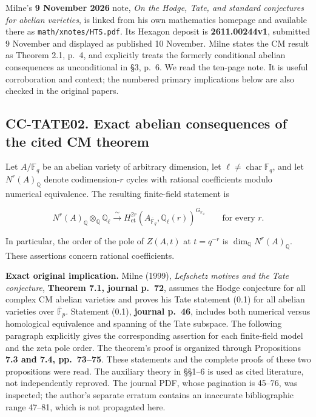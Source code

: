 \documentclass[11pt,a4paper]{article}
\theoremstyle{definition}\newtheorem{definition}[theorem]{Definition}
\theoremstyle{remark}\newtheorem{remark}[theorem]{Remark}
\begin{document}
Milne's \textbf{9 November 2026} note, \emph{On the Hodge, Tate, and
standard conjectures for abelian varieties}, is linked from his own
mathematics homepage and available there as
\texttt{math/xnotes/HTS.pdf}. Its Hexagon deposit is
\textbf{2611.00244v1}, submitted 9 November and displayed as published
10 November. Milne states the CM result as Theorem 2.1, p.~4, and
explicitly treats the formerly conditional abelian consequences as
unconditional in §3, p.~6. We read the ten-page note. It is useful
corroboration and context; the numbered primary implications below are
also checked in the original papers.

\subsection{CC-TATE02. Exact abelian consequences of the cited CM
theorem}\label{cc-tate02.-exact-abelian-consequences-of-the-cited-cm-theorem}

Let \(A/\mathbb F_q\) be an abelian variety of arbitrary dimension, let
\(\ell\ne\operatorname{char}\mathbb F_q\), and let
\(N^r(A)_{\mathbb Q}\) denote codimension-\(r\) cycles with rational
coefficients modulo numerical equivalence. The resulting finite-field
statement is

\[
N^r(A)_{\mathbb Q}\otimes_{\mathbb Q}\mathbb Q_\ell
\xrightarrow{\ \sim\ }
H^{2r}_{\mathrm{et}}(A_{\overline{\mathbb F}_q},\mathbb Q_\ell(r))^{G_{\mathbb F_q}}
\qquad\text{for every }r.
\]

In particular, the order of the pole of \(Z(A,t)\) at \(t=q^{-r}\) is
\(\dim_{\mathbb Q}N^r(A)_{\mathbb Q}\). These assertions concern
rational coefficients.

\textbf{Exact original implication.} Milne (1999), \emph{Lefschetz
motives and the Tate conjecture}, \textbf{Theorem 7.1, journal p.~72},
assumes the Hodge conjecture for all complex CM abelian varieties and
proves his Tate statement (0.1) for all abelian varieties over
\(\overline{\mathbb F}_p\). Statement (0.1), \textbf{journal p.~46},
includes both numerical versus homological equivalence and spanning of
the Tate subspace. The following paragraph explicitly gives the
corresponding assertion for each finite-field model and the zeta pole
order. The theorem's proof is organized through Propositions \textbf{7.3
and 7.4, pp.~73--75}. These statements and the complete proofs of these
two propositions were read. The auxiliary theory in §§1--6 is used as
cited literature, not independently reproved. The journal PDF, whose
pagination is 45--76, was inspected; the author's separate erratum
contains an inaccurate bibliographic range 47--81, which is not
propagated here.
\end{document}
